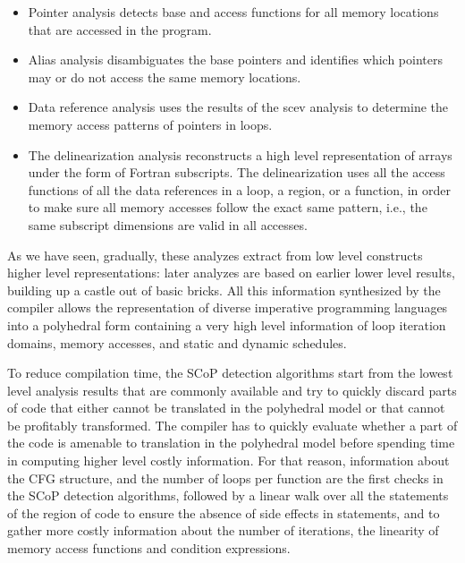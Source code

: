 \documentclass{sigplanconf}
\begin{document}
\begin{itemize}
\item Pointer analysis detects base and access functions for all memory
  locations that are accessed in the program.

\item Alias analysis disambiguates the base pointers and identifies which
  pointers may or do not access the same memory locations.

\item Data reference analysis uses the results of the scev analysis to determine
  the memory access patterns of pointers in loops.

\item The delinearization analysis \cite{delinearization1, delinearization2}
  reconstructs a high level representation of arrays under the form of Fortran
  subscripts.  The delinearization uses all the access functions of all the data
  references in a loop, a region, or a function, in order to make sure all
  memory accesses follow the exact same pattern, i.e., the same subscript
  dimensions are valid in all accesses.
\end{itemize}

As we have seen, gradually, these analyzes extract from low level constructs
higher level representations: later analyzes are based on earlier lower level
results, building up a castle out of basic bricks.  All this information
synthesized by the compiler allows the representation of diverse imperative
programming languages into a polyhedral form \cite{Girbal} containing a very
high level information of loop iteration domains, memory accesses, and static
and dynamic schedules.

To reduce compilation time, the SCoP detection algorithms start from the lowest
level analysis results that are commonly available and try to quickly discard
parts of code that either cannot be translated in the polyhedral model or that
cannot be profitably transformed.  The compiler has to quickly evaluate whether
a part of the code is amenable to translation in the polyhedral model before
spending time in computing higher level costly information.  For that reason,
information about the CFG structure, and the number of loops per function are
the first checks in the SCoP detection algorithms, followed by a linear walk
over all the statements of the region of code to ensure the absence of side
effects in statements, and to gather more costly information about the number of
iterations, the linearity of memory access functions and condition expressions.
\end{document}
